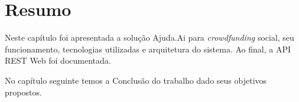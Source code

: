 \section*{Resumo} \label{sec:ajudaai:resumo}
Neste capítulo foi apresentada a solução Ajuda.Ai para \emph{crowdfunding} social, seu funcionamento, tecnologias utilizadas e arquitetura do sistema. Ao final, a API REST Web foi documentada.

No capítulo seguinte temos a Conclusão do trabalho dado seus objetivos propostos.